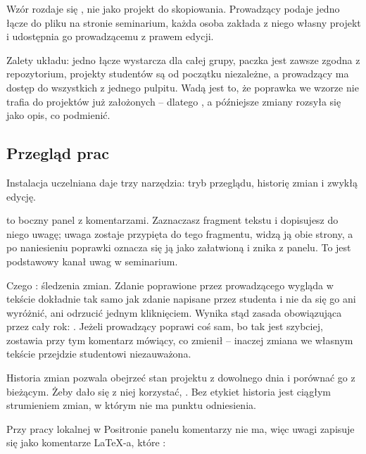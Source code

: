 Wzór rozdaje się , nie jako projekt do skopiowania. Prowadzący podaje jedno łącze do pliku  na stronie seminarium, każda osoba zakłada z niego własny projekt i udostępnia go prowadzącemu z prawem edycji.

Zalety układu: jedno łącze wystarcza dla całej grupy, paczka jest zawsze zgodna z repozytorium, projekty studentów są od początku niezależne, a prowadzący ma dostęp do wszystkich z jednego pulpitu. Wadą jest to, że poprawka we wzorze nie trafia do projektów już założonych -- dlatego , a późniejsze zmiany rozsyła się jako opis, co podmienić.

\subsection{Przegląd prac}

Instalacja uczelniana daje trzy narzędzia: tryb przeglądu, historię zmian i zwykłą edycję.

 to boczny panel z komentarzami. Zaznaczasz fragment tekstu i dopisujesz do niego uwagę; uwaga zostaje przypięta do tego fragmentu, widzą ją obie strony, a po naniesieniu poprawki oznacza się ją jako załatwioną i znika z panelu. To jest podstawowy kanał uwag w seminarium.

Czego : śledzenia zmian. Zdanie poprawione przez prowadzącego wygląda w tekście dokładnie tak samo jak zdanie napisane przez studenta i nie da się go ani wyróżnić, ani odrzucić jednym kliknięciem. Wynika stąd zasada obowiązująca przez cały rok: . Jeżeli prowadzący poprawi coś sam, bo tak jest szybciej, zostawia przy tym komentarz mówiący, co zmienił -- inaczej zmiana we własnym tekście przejdzie studentowi niezauważona.

Historia zmian pozwala obejrzeć stan projektu z dowolnego dnia i porównać go z bieżącym. Żeby dało się z niej korzystać, . Bez etykiet historia jest ciągłym strumieniem zmian, w którym nie ma punktu odniesienia.

Przy pracy lokalnej w Positronie panelu komentarzy nie ma, więc uwagi zapisuje się jako komentarze LaTeX-a, które :

\begin{zapis}
\end{zapis}

